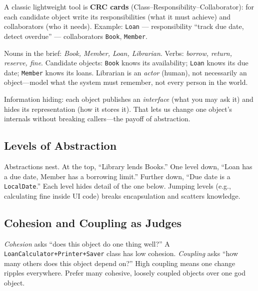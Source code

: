 A classic lightweight tool is \textbf{CRC cards} (Class--Responsibility--Collaborator): for each candidate object write its responsibilities (what it must achieve) and collaborators (who it needs). Example: \texttt{Loan} --- responsibility ``track due date, detect overdue'' --- collaborators \texttt{Book}, \texttt{Member}.

\begin{example}
Nouns in the brief: \emph{Book, Member, Loan, Librarian}. Verbs: \emph{borrow, return, reserve, fine}. Candidate objects: \texttt{Book} knows its availability; \texttt{Loan} knows its due date; \texttt{Member} knows its loans. Librarian is an \emph{actor} (human), not necessarily an object---model what the system must remember, not every person in the world.
\end{example}

Information hiding: each object publishes an \emph{interface} (what you may ask it) and hides its representation (how it stores it). That lets us change one object's internals without breaking callers---the payoff of abstraction.

\subsection{Levels of Abstraction}
Abstractions nest. At the top, ``Library lends Books.'' One level down, ``Loan has a due date, Member has a borrowing limit.'' Further down, ``Due date is a \texttt{LocalDate}.'' Each level hides detail of the one below. Jumping levels (e.g., calculating fine inside UI code) breaks encapsulation and scatters knowledge.

\subsection{Cohesion and Coupling as Judges}
\emph{Cohesion} asks ``does this object do one thing well?'' A \texttt{LoanCalculator+Printer+Saver} class has low cohesion. \emph{Coupling} asks ``how many others does this object depend on?'' High coupling means one change ripples everywhere. Prefer many cohesive, loosely coupled objects over one god object.

